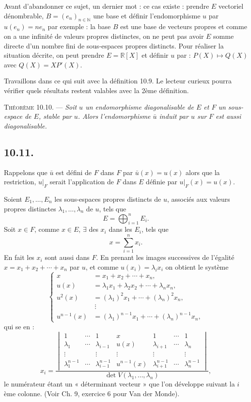 Avant d'abandonner ce sujet, un dernier mot : ce cas existe : prendre $E$ vectoriel dénombrable, $B=(e_n)_{n\in\mathbb N}$ une base et définir l'endomorphisme $u$ par $u(e_n)=ne_n$ par exemple : la base $B$ est une base de vecteurs propres et comme on a une infinité de valeurs propres distinctes, on ne peut pas avoir $E$ somme directe d'un nombre fini de sous-espaces propres distincts. Pour réaliser la situation décrite, on peut prendre $E=\mathbb R[X]$ et définir $u$ par : $P(X)\longmapsto Q(X)$ avec $Q(X)=XP'(X)$.

Travaillons dans ce qui suit avec la définition 10.9. Le lecteur curieux pourra vérifier quels résultats restent valables avec la 2ème définition.

\medskip\noindent\textsc{Théorème 10.10.} --- \emph{Soit $u$ un endomorphisme diagonalisable de $E$ et $F$ un sous-espace de $E$, stable par $u$. Alors l'endomorphisme $\bar u$ induit par $u$ sur $F$ est aussi diagonalisable.}

\subsection*{10.11.}
Rappelons que $\bar u$ est défini de $F$ dans $F$ par $\bar u(x)=u(x)$ alors que la restriction, $u|_F$ serait l'application de $F$ dans $E$ définie par $u|_F(x)=u(x)$.

Soient $E_1,\ldots,E_n$ les sous-espaces propres distincts de $u$, associés aux valeurs propres distinctes $\lambda_1,\ldots,\lambda_n$ de $u$, tels que
\[
E=\bigoplus_{i=1}^nE_i.
\]
Soit $x\in F$, comme $x\in E$, $\exists$ des $x_i$ dans les $E_i$, tels que
\[
x=\sum_{i=1}^nx_i.
\]
En fait les $x_i$ sont aussi dans $F$. En prenant les images successives de l'égalité $x=x_1+x_2+\cdots+x_n$ par $u$, et comme $u(x_i)=\lambda_ix_i$ on obtient le système
\[
\tag{I}
\left\{
\begin{aligned}
x&=x_1+x_2+\cdots+x_n,\\
u(x)&=\lambda_1x_1+\lambda_2x_2+\cdots+\lambda_nx_n,\\
u^2(x)&=(\lambda_1)^2x_1+\cdots+(\lambda_n)^2x_n,\\
&\ \vdots\\
u^{n-1}(x)&=(\lambda_1)^{n-1}x_1+\cdots+(\lambda_n)^{n-1}x_n,
\end{aligned}
\right.
\]
qui se  en :
\[
\tag{II}
x_i=
\frac{
\begin{vmatrix}
1&\cdots&1&x&1&\cdots&1\\
\lambda_1&\cdots&\lambda_{i-1}&u(x)&\lambda_{i+1}&\cdots&\lambda_n\\
\vdots&&\vdots&\vdots&\vdots&&\vdots\\
\lambda_1^{n-1}&\cdots&\lambda_{i-1}^{n-1}&u^{n-1}(x)&\lambda_{i+1}^{n-1}&\cdots&\lambda_n^{n-1}
\end{vmatrix}
}{\det V(\lambda_1,\ldots,\lambda_n)},
\]
le numérateur étant un « déterminant vecteur » que l'on développe suivant la $i$ème colonne. (Voir Ch. 9, exercice 6 pour Van der Monde).

